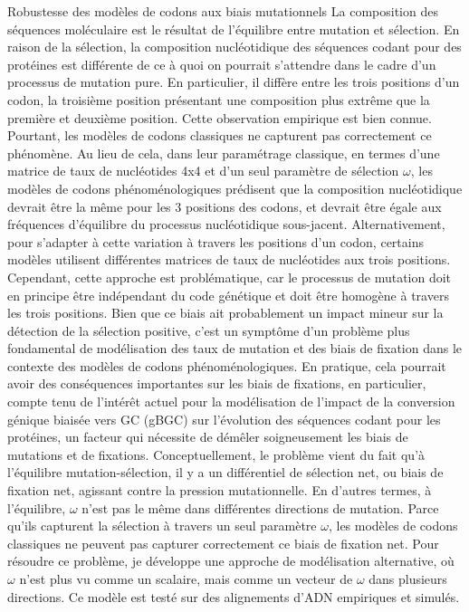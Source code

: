 Robustesse des modèles de codons aux biais mutationnels
La composition des séquences moléculaire est le résultat de l'équilibre entre mutation et sélection.
En raison de la sélection, la composition nucléotidique des séquences codant pour des protéines est différente de ce à quoi on pourrait s'attendre dans le cadre d'un processus de mutation pure.
En particulier, il diffère entre les trois positions d’un codon, la troisième position présentant une composition plus extrême que la première et deuxième position.
Cette observation empirique est bien connue.
Pourtant, les modèles de codons classiques ne capturent pas correctement ce phénomène.
Au lieu de cela, dans leur paramétrage classique, en termes d'une matrice de taux de nucléotides 4x4 et d'un seul paramètre de sélection $\omega$, les modèles de codons phénoménologiques prédisent que la composition nucléotidique devrait être la même pour les 3 positions des codons, et devrait être égale aux fréquences d'équilibre du processus nucléotidique sous-jacent.
Alternativement, pour s'adapter à cette variation à travers les positions d’un codon, certains modèles utilisent différentes matrices de taux de nucléotides aux trois positions.
Cependant, cette approche est problématique, car le processus de mutation doit en principe être indépendant du code génétique et doit être homogène à travers les trois positions.
Bien que ce biais ait probablement un impact mineur sur la détection de la sélection positive, c'est un symptôme d'un problème plus fondamental de modélisation des taux de mutation et des biais de fixation dans le contexte des modèles de codons phénoménologiques.
En pratique, cela pourrait avoir des conséquences importantes sur les biais de fixations, en particulier, compte tenu de l'intérêt actuel pour la modélisation de l'impact de la conversion génique biaisée vers GC (gBGC) sur l'évolution des séquences codant pour les protéines, un facteur qui nécessite de démêler soigneusement les biais de mutations et de fixations.
Conceptuellement, le problème vient du fait qu'à l'équilibre mutation-sélection, il y a un différentiel de sélection net, ou biais de fixation net, agissant contre la pression mutationnelle.
En d'autres termes, à l'équilibre, $\omega$ n'est pas le même dans différentes directions de mutation.
Parce qu'ils capturent la sélection à travers un seul paramètre $\omega$, les modèles de codons classiques ne peuvent pas capturer correctement ce biais de fixation net.
Pour résoudre ce problème, je développe une approche de modélisation alternative, où $\omega$ n'est plus vu comme un scalaire, mais comme un vecteur de $\omega$ dans plusieurs directions.
Ce modèle est testé sur des alignements d'ADN empiriques et simulés.

